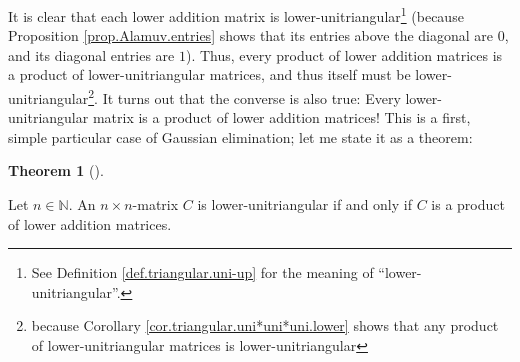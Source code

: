 \documentclass[numbers=enddot,12pt,final,onecolumn,notitlepage]{scrartcl}%
\theoremstyle{definition}
\newtheorem{theo}{Theorem}[section]
\newenvironment{theorem}[1][]
{\begin{theo}[#1]\begin{leftbar}}
{\end{leftbar}\end{theo}}
\begin{document}
It is clear that each lower addition matrix is
lower-unitriangular\footnote{See Definition \ref{def.triangular.uni-up} for
the meaning of \textquotedblleft lower-unitriangular\textquotedblright.}
(because Proposition \ref{prop.Alamuv.entries} shows that its entries above
the diagonal are $0$, and its diagonal entries are $1$). Thus, every product
of lower addition matrices is a product of lower-unitriangular matrices, and
thus itself must be lower-unitriangular\footnote{because Corollary
\ref{cor.triangular.uni*uni*uni.lower} shows that any product of
lower-unitriangular matrices is lower-unitriangular}. It turns out that the
converse is also true: Every lower-unitriangular matrix is a product of lower
addition matrices! This is a first, simple particular case of Gaussian
elimination; let me state it as a theorem:

\begin{theorem}
\label{thm.triangular.Alamuv}Let $n\in\mathbb{N}$. An $n\times n$-matrix $C$
is lower-unitriangular if and only if $C$ is a product of lower addition matrices.
\end{theorem}
\end{document}
